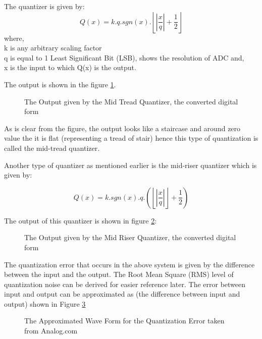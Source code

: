 \documentclass[colorlinks=true,pdfstartview=FitV,linkcolor=blue,
            citecolor=red,urlcolor=magenta]{ligodoc}
\begin{document}
 The quantizer is given by:
\begin{equation}
Q(x)=k.q.sgn(x).\left\lfloor\left|\frac{x}{q}\right|+\frac{1}{2}\right\rfloor
\end{equation}
 where,\\ k is any arbitrary scaling factor\\
 q is equal to 1 Least Significant Bit (LSB), shows the resolution of ADC
 and, \\
 x is the input to which Q(x) is the output.
 
   
The output is shown in the figure \ref{tread}. 
\begin{figure}[htbp] 
 
  \centering
  
  \caption{The Output given by the Mid Tread Quantizer, the converted digital form}
  \label{tread}
\end{figure}

As is clear from the figure, the output looks like a staircase and around zero value the it is flat (representing a tread of stair) hence this type of quantization is called the mid-tread quantizer. 

Another type of quantizer \cite{Wikipedia} as mentioned earlier is the mid-riser quantizer which is given by:

\begin{equation}
Q(x)=k.sgn(x).q.\left(\left\lfloor\left|\frac{x}{q}\right|\right\rfloor + \frac{1}{2} \right)
\end{equation}

The output of this quantizer is shown in figure \ref{rise}:
\begin{figure}[htbp] 
 \centering
 
 \label{rise}
 \caption{The Output given by the Mid Riser Quantizer, the converted digital form} 
\end{figure}

The quantization error that occurs in the above system is given by the difference between the input and the output. The Root Mean Square (RMS) level of quantization noise can be derived for easier reference later.
The error between input and output can be approximated as (the difference between input and output) shown in Figure \ref{error}

 \begin{figure}[htbp]
 
  \centering
  
  \label{error}
  \caption{The Approximated Wave Form for the Quantization Error taken from Analog.com}
 
\end{figure}
\end{document}
